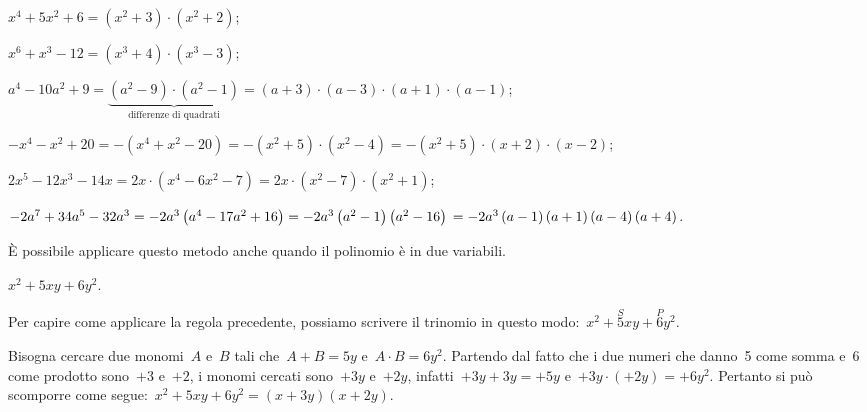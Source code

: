 \begin{exrig}
\begin{esempio}
\begin{itemize*}
\item $x^{4}+5x^{2}+6=\left(x^{2}+3\right)\cdot \left(x^{2}+2\right)$;
\item $x^{6}+x^{3}-12=\left(x^{3}+4\right)\cdot \left(x^{3}-3\right)$;
\item $a^{4}-10a^{2}+9=\underbrace{\left(a^{2}-9\right)\cdot\left(a^{2}-1\right)}_{\text{differenze di quadrati}}=\left(a+3\right)\cdot \left(a-3\right)\cdot \left(a+1\right)\cdot\left(a-1\right)$;
\item $-x^{4}-x^{2}+20=-\left(x^{4}+x^{2}-20\right)=-\left(x^{2}+5\right)\cdot\left(x^{2}-4\right)=-\left(x^{2}+5\right)\cdot%
\left(x+2\right)\cdot \left(x-2\right)$;
\item $2x^{5}-12x^{3}-14x=2x\cdot \left(x^{4}-6x^{2}-7\right)=2x\cdot%
\left(x^{2}-7\right)\cdot \left(x^{2}+1\right)$;
\item $-2a^{7}+34a^{5}-32a^{3}=-2a^{3}\left(a^{4}-17a^{2}+16\right)
    =-2a^{3}\left(a^{2}-1\right)\left(a^{2}-16\right)\\
    =-2a^{3}\left(a-1\right)\left(a+1\right)\left(a-4\right)\left(a+4\right).$
\end{itemize*}
\end{esempio}

\end{exrig}

È possibile applicare questo metodo anche quando il
polinomio è in due variabili.

\begin{exrig}
 \begin{esempio}
 $x^{2}+5xy+6y^{2}$.

 Per capire come applicare la regola precedente, possiamo scrivere il
trinomio in questo modo:~$x^{2}+\overset{S}{5}xy+\overset{P}{6}y{^{2}}$.

Bisogna cercare due monomi~$A$ e~$B$ tali che~$A+B=5y$
e~$A\cdot B=6y^{2}$. Partendo dal fatto che i due numeri che danno~5
come somma e~6 come prodotto sono~$+3$ e~$+2$, i monomi cercati sono~$+3y$ e~$+2y$,
infatti~$+3y+3y=+5y$ e~$+3y\cdot (+2y)=+6y^{2}$. Pertanto si
può scomporre come segue:~$x^{2}+5xy+6y^{2}=(x+3y)(x+2y)$.
 \end{esempio}
\end{exrig}


